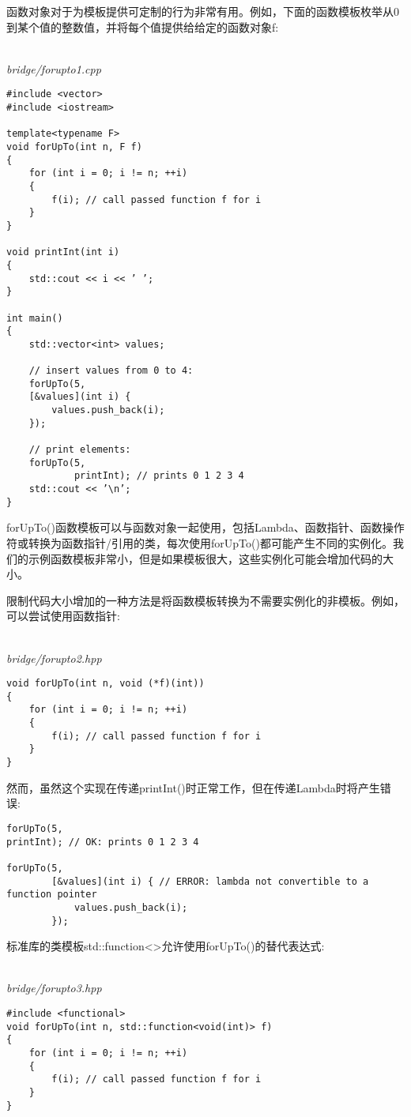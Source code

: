 
函数对象对于为模板提供可定制的行为非常有用。例如，下面的函数模板枚举从0到某个值的整数值，并将每个值提供给给定的函数对象f:

\hspace*{\fill} \\ %
\noindent
\textit{bridge/forupto1.cpp}
\begin{lstlisting}[style=styleCXX]
#include <vector>
#include <iostream>

template<typename F>
void forUpTo(int n, F f)
{
	for (int i = 0; i != n; ++i)
	{
		f(i); // call passed function f for i
	}
}

void printInt(int i)
{
	std::cout << i << ’ ’;
}

int main()
{
	std::vector<int> values;
	
	// insert values from 0 to 4:
	forUpTo(5,
	[&values](int i) {
		values.push_back(i);
	});

	// print elements:
	forUpTo(5,
			printInt); // prints 0 1 2 3 4
	std::cout << ’\n’;
}
\end{lstlisting}

forUpTo()函数模板可以与函数对象一起使用，包括Lambda、函数指针、函数操作符或转换为函数指针/引用的类，每次使用forUpTo()都可能产生不同的实例化。我们的示例函数模板非常小，但是如果模板很大，这些实例化可能会增加代码的大小。

限制代码大小增加的一种方法是将函数模板转换为不需要实例化的非模板。例如，可以尝试使用函数指针:

\hspace*{\fill} \\ %
\noindent
\textit{bridge/forupto2.hpp}
\begin{lstlisting}[style=styleCXX]
void forUpTo(int n, void (*f)(int))
{
	for (int i = 0; i != n; ++i)
	{
		f(i); // call passed function f for i
	}
}
\end{lstlisting}

然而，虽然这个实现在传递printInt()时正常工作，但在传递Lambda时将产生错误:

\begin{lstlisting}[style=styleCXX]
forUpTo(5,
printInt); // OK: prints 0 1 2 3 4

forUpTo(5,
		[&values](int i) { // ERROR: lambda not convertible to a function pointer
			values.push_back(i);
		});
\end{lstlisting}

标准库的类模板std::function<>允许使用forUpTo()的替代表达式:

\hspace*{\fill} \\ %
\noindent
\textit{bridge/forupto3.hpp}
\begin{lstlisting}[style=styleCXX]
#include <functional>
void forUpTo(int n, std::function<void(int)> f)
{
	for (int i = 0; i != n; ++i)
	{
		f(i); // call passed function f for i
	}
}
\end{lstlisting}

